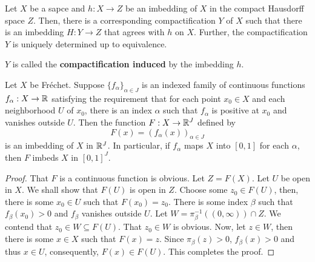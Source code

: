 \begin{lemma}
    Let $X$ be a sapce and $h: X\to Z$ be an imbedding of $X$ in the compact Hausdorff space $Z$. Then, there is a corresponding compactification $Y$ of $X$ such that there is an imbedding $H: Y\to Z$ that agrees with $h$ on $X$. Further, the compactification $Y$ is uniquely determined up to equivalence.
\end{lemma}
$Y$ is called the \textbf{compactification induced} by the imbedding $h$.

\begin{theorem}
    Let $X$ be Fr\'echet. Suppose $\{f_\alpha\}_{\alpha\in J}$ is an indexed family of continuous functions $f_\alpha: X\to\mathbb{R}$ satisfying the requirement that for each point $x_0\in X$ and each neighborhood $U$ of $x_0$, there is an index $\alpha$ such that $f_\alpha$ is positive at $x_0$ and vanishes outside $U$. Then the function $F: X\to\mathbb{R}^J$ defined by 
    \begin{equation*}
        F(x) = (f_\alpha(x))_{\alpha\in J}
    \end{equation*}
    is an imbedding of $X$ in $\mathbb{R}^J$. In particular, if $f_\alpha$ maps $X$ into $[0,1]$ for each $\alpha$, then $F$ imbeds $X$ in $[0,1]^J$.
\end{theorem}
\begin{proof}
    That $F$ is a continuous function is obvious. Let $Z = F(X)$. Let $U$ be open in $X$. We shall show that $F(U)$ is open in $Z$. Choose some $z_0\in F(U)$, then, there is some $x_0\in U$ such that $F(x_0) = z_0$. There is some index $\beta$ such that $f_\beta(x_0) > 0$ and $f_\beta$ vanishes outside $U$. Let $W = \pi_\beta^{-1}((0,\infty))\cap Z$. We contend that $z_0\in W\subseteq F(U)$. That $z_0\in W$ is obvious. Now, let $z\in W$, then there is some $x\in X$ such that $F(x) = z$. Since $\pi_\beta(z) > 0$, $f_\beta(x) > 0$ and thus $x\in U$, consequently, $F(x)\in F(U)$. This completes the proof.
\end{proof}


